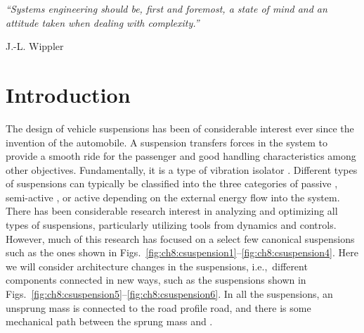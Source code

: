 
\epigraph{\textit{``Systems engineering should be, first and foremost, a state of mind and an attitude taken when dealing with complexity.''}}{\textmd{J.-L. Wippler} \cite[p.~208]{Luzeaux2013a}}

\section{Introduction\label{sec:ch8:introduction}}

The design of vehicle suspensions has been of considerable interest ever since the invention of the automobile.
A suspension transfers forces in the system to provide a smooth ride for the passenger and good handling characteristics among other objectives.
Fundamentally, it is a type of vibration isolator \cite{Kasturi1998a, Hrovat1997a, Hrovat1993a}.
Different types of suspensions can typically be classified into the three categories of passive \cite{Kasturi1998a, Gobbi2001a, He2005a, Allison2008b, Hrovat1997a, Hrovat1993a}, semi-active \cite{Deshmukh2015a, Koch2014a, Hrovat1993a, Bourmistrova2005a}, or active \cite{Fathy2003a, Alyaqout2007b, Allison2014b, Hrovat1997a, Ulsoy1994a, Hrovat1993a} depending on the external energy flow into the system. 
There has been considerable research interest in analyzing and optimizing all types of suspensions, particularly utilizing tools from dynamics and controls.
However, much of this research has focused on a select few canonical suspensions such as the ones shown in Figs.~\ref{fig:ch8:csuspension1}--\ref{fig:ch8:csuspension4}. 
Here we will consider architecture changes in the suspensions, i.e.,~different components connected in new ways, such as the suspensions shown in Figs.~\ref{fig:ch8:csuspension5}--\ref{fig:ch8:csuspension6}.
In all the suspensions, an unsprung mass  is connected to the road profile \gls{road}, and there is some mechanical path between the sprung mass  and .

